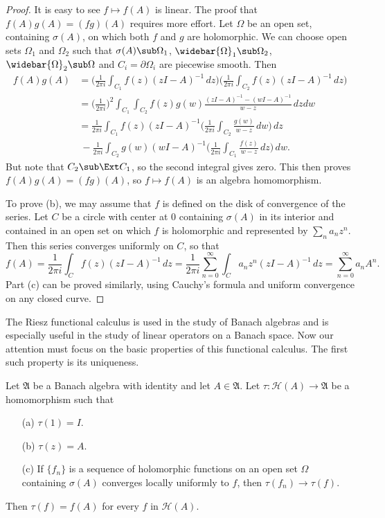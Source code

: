 \begin{proof}
It is easy to see $f\mapsto f(A)$ is linear. The proof that $f(A)g(A)=(fg)(A)$ requires more effort. Let $\Omega$ be an open set, containing $\sigma(A)$, on which both $f$ and $g$ are holomorphic. We can choose open sets $\Omega_1$ and $\Omega_2$ such that $\sigma(A)\sub\Omega_1$, $\widebar{\Omega}_1\sub\Omega_2$, $\widebar{\Omega}_2\sub\Omega$ and $C_i=\partial\Omega_i$ are piecewise smooth. Then
\begin{align*}
f(A)g(A)&=\Big(\frac{1}{2\pi i}\int_{C_1}f(z)(zI-A)^{-1}\,dz\Big)\Big(\frac{1}{2\pi i}\int_{C_2}f(z)(zI-A)^{-1}\,dz\Big)\\
&=\Big(\frac{1}{2\pi i}\Big)^2\int_{C_1}\int_{C_2}f(z)g(w)\frac{(zI-A)^{-1}-(wI-A)^{-1}}{w-z}\,dzdw\\
&=\frac{1}{2\pi i}\int_{C_1}f(z)(zI-A)^{-1}\Big(\frac{1}{2\pi i}\int_{C_2}\frac{g(w)}{w-z}\,dw\Big)\,dz\\
&\ -\frac{1}{2\pi i}\int_{C_2}g(w)(wI-A)^{-1}\Big(\frac{1}{2\pi i}\int_{C_1}\frac{f(z)}{w-z}\,dz\Big)\,dw.
\end{align*}
But note that $C_2\sub\Ext C_1$, so the second integral gives zero. This then proves $f(A)g(A)=(fg)(A)$, so $f\mapsto f(A)$ is an algebra homomorphism.\par
To prove (b), we may assume that $f$ is defined on the disk of convergence of the series. Let $C$ be a circle with center at $0$ containing $\sigma(A)$ in its interior and contained in an open set on which $f$ is holomorphic and represented by $\sum_na_nz^n$. Then this series converges uniformly on $C$, so that
\[f(A)=\frac{1}{2\pi i}\int_Cf(z)(zI-A)^{-1}\,dz=\frac{1}{2\pi i}\sum_{n=0}^{\infty}\int_Ca_nz^n(zI-A)^{-1}\,dz=\sum_{n=0}^{\infty}a_nA^n.\]
Part (c) can be proved similarly, using Cauchy's formula and uniform convergence on any closed curve.
\end{proof}
The Riesz functional calculus is used in the study of Banach algebras and is especially useful in the study of linear operators on a Banach space. Now our attention must focus on the basic properties of this functional calculus. The first such property is its uniqueness.
\begin{proposition}\label{Reisz function calculus uniqueness}
Let $\mathfrak{A}$ be a Banach algebra with identity and let $A\in\mathfrak{A}$. Let $\tau:\mathcal{H}(A)\to\mathfrak{A}$ be a homomorphism such that
\begin{itemize}
\item[(a)] $\tau(1)=I$.
\item[(b)] $\tau(z)=A$.
\item[(c)] If $\{f_n\}$ is a sequence of holomorphic functions on an open set $\Omega$ containing $\sigma(A)$ converges locally uniformly to $f$, then $\tau(f_n)\to\tau(f)$.
\end{itemize}
Then $\tau(f)=f(A)$ for every $f$ in $\mathcal{H}(A)$.
\end{proposition}
